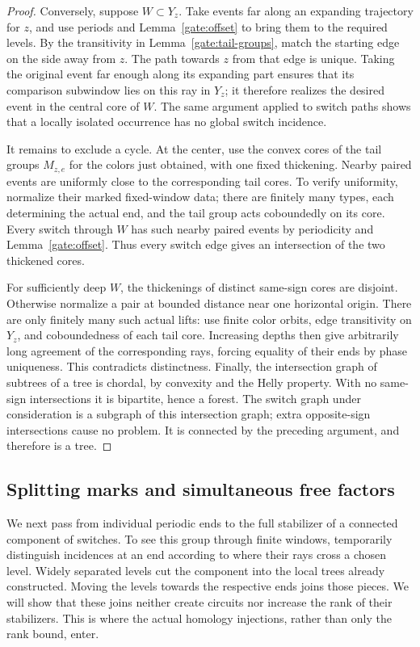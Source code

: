 \begin{proof}
Conversely, suppose $W\subset Y_z$.  Take events far along an expanding
trajectory for $z$, and use periods and Lemma~\ref{gate:offset} to bring
them to the required levels.  By the transitivity in
Lemma~\ref{gate:tail-groups}, match the starting edge on the side away
from $z$.  The path towards $z$ from that edge is unique.  Taking the
original event far enough along its expanding part ensures that its
comparison subwindow lies on this ray in $Y_z$; it therefore realizes
the desired event in the central core of $W$.  The same argument applied
to switch paths shows that a locally isolated occurrence has no global
switch incidence.

It remains to exclude a cycle.  At the center, use the convex cores of
the tail groups $M_{z,e}$ for the colors just obtained, with one fixed
thickening.  Nearby paired events are uniformly close to the corresponding
tail cores.  To verify uniformity, normalize their marked fixed-window
data; there are finitely many types, each determining the actual end,
and the tail group acts coboundedly on its core.  Every switch through
$W$ has such nearby paired events by periodicity and
Lemma~\ref{gate:offset}.  Thus every switch edge gives an intersection
of the two thickened cores.

For sufficiently deep $W$, the thickenings of distinct same-sign cores
are disjoint.  Otherwise normalize a pair at bounded distance near one
horizontal origin.  There are only finitely many such actual lifts: use
finite color orbits, edge transitivity on $Y_z$, and coboundedness of each
tail core.  Increasing depths then give arbitrarily long agreement of
the corresponding rays, forcing equality of their ends by phase
uniqueness.  This contradicts distinctness.  Finally, the intersection
graph of subtrees of a tree is chordal, by convexity and the Helly
property.  With no same-sign intersections it is bipartite, hence a
forest.  The switch graph under consideration is a subgraph of this
intersection graph; extra opposite-sign intersections cause no problem.
It is connected by the preceding argument, and therefore is a tree.
\end{proof}

\subsection{Splitting marks and simultaneous free factors}

We next pass from individual periodic ends to the full stabilizer of
a connected component of switches. To see this group through finite
windows, temporarily distinguish incidences at an end according to
where their rays cross a chosen level. Widely separated levels cut
the component into the local trees already constructed. Moving the
levels towards the respective ends joins those pieces. We will show
that these joins neither create circuits nor increase the rank of
their stabilizers. This is where the actual homology injections,
rather than only the rank bound, enter.

